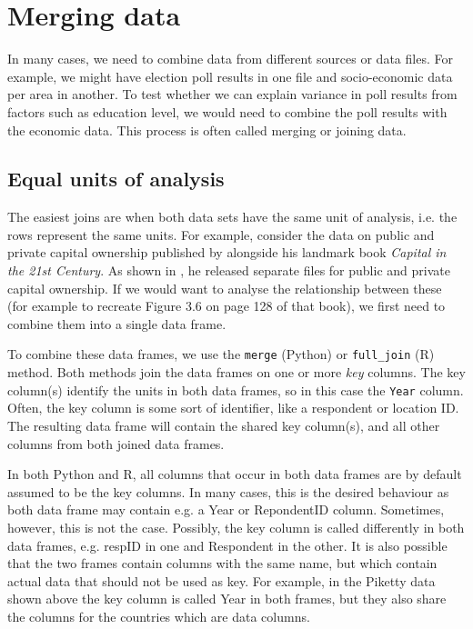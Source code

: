 \section{Merging data}

In many cases, we need to combine data from different sources or data files.
For example, we might have election poll results in one file and socio-economic data per area in another.
To test whether we can explain variance in poll results from factors such as education level,
we would need to combine the poll results with the economic data.
This process is often called merging or joining data.

\subsection{Equal units of analysis}


The easiest joins are when both data sets have the same unit of analysis,
i.e. the rows represent the same units.
For example, consider the data on public and private capital ownership published by
\cite{Piketty} alongside his landmark book \emph{Capital in the 21st Century}.
As shown in , he released separate files for public and private capital ownership.
If we would want to analyse the relationship between these (for example to recreate Figure 3.6 on page 128 of that book),
we first need to combine them into a single data frame.

To combine these data frames, we use the \verb+merge+ (Python) or \verb+full_join+ (R) method.
Both methods join the data frames on one or more \emph{key} columns.
The key column(s) identify the units in both data frames, so in this case the \verb+Year+ column.
Often, the key column is some sort of identifier, like a respondent or location ID.
The resulting data frame will contain the shared key column(s), and all other columns from both joined data frames.

In both Python and R, all columns that occur in both data frames are by default assumed to be the key columns.
In many cases, this is the desired behaviour as both data frame may contain e.g. a Year or RepondentID column.
Sometimes, however, this is not the case.
Possibly, the key column is called differently in both data frames, e.g. respID in one and Respondent in the other. 
It is also possible that the two frames contain columns with the same name, but which contain actual data that should not be used as key.
For example, in the Piketty data shown above the key column is called Year in both frames, but they also share the columns for the countries which are data columns.

